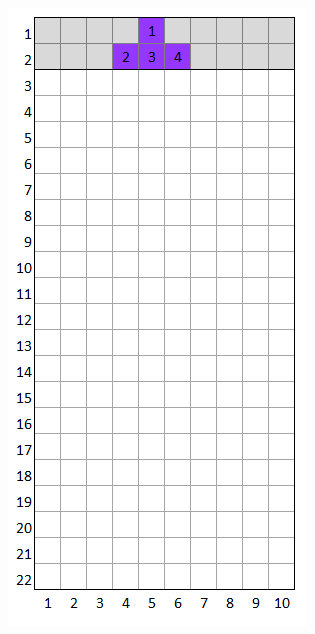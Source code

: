 \documentclass[a4paper]{article}
\begin{document}
	\begin{minipage}{0.2\textwidth}
		\centering
		\includegraphics[scale=0.4]{resources/img/minos/mino_purple}
		\label{fig:mino-purple}
	\end{minipage}%
\end{document}
